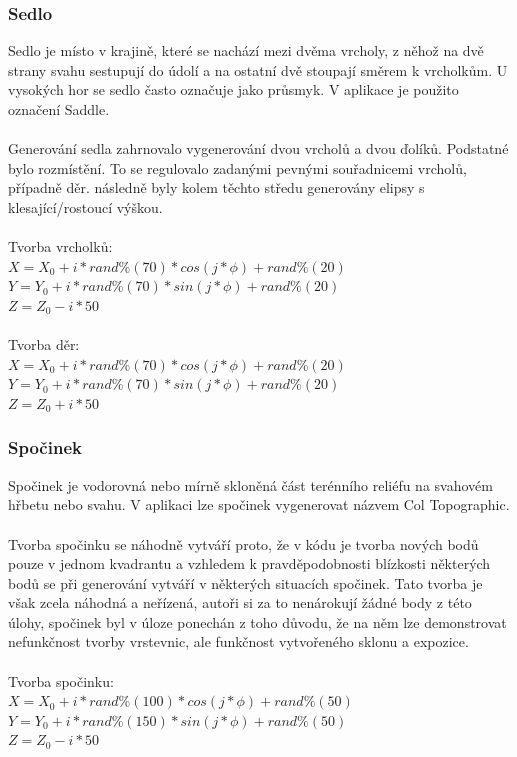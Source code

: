 \documentclass[a4paper, 12pt]{article}
\begin{document}
\subsubsection{Sedlo}
Sedlo je místo v krajině, které se nachází mezi dvěma vrcholy, z něhož na dvě strany svahu sestupují do údolí a na ostatní dvě stoupají směrem k vrcholkům. U vysokých hor se sedlo často označuje jako průsmyk. V aplikace je použito označení Saddle. \\
\\
Generování sedla zahrnovalo vygenerování dvou vrcholů a dvou ďolíků. Podstatné bylo rozmístění. To se regulovalo zadanými pevnými souřadnicemi vrcholů, případně děr. následně byly kolem těchto středu generovány elipsy s klesající/rostoucí výškou. \\
\\
Tvorba vrcholků: \\
$ X = X_0 + i * rand\%(70) * cos(j*\phi) + rand\%(20) $ \\
$ Y =  Y_0 + i * rand\%(70) * sin(j*\phi) + rand\%(20) $ \\
$ Z = Z_0 - i * 50 $ \\
\\
Tvorba děr: \\
$ X = X_0 + i * rand\%(70) * cos(j*\phi) + rand\%(20) $ \\
$ Y =  Y_0 + i * rand\%(70) * sin(j*\phi) + rand\%(20) $ \\
$ Z = Z_0 + i * 50 $ \\

\subsubsection{Spočinek}
Spočinek je vodorovná nebo mírně skloněná část terénního reliéfu na svahovém hřbetu nebo svahu. V aplikaci lze spočinek vygenerovat názvem Col Topographic. \\
\\
Tvorba spočinku se náhodně vytváří proto, že v kódu je tvorba nových bodů pouze v jednom kvadrantu a vzhledem k pravděpodobnosti blízkosti některých bodů se při generování vytváří v některých situacích spočinek. Tato tvorba je však zcela náhodná a neřízená, autoři si za to nenárokují žádné body z této úlohy, spočinek byl v úloze ponechán z toho důvodu, že na něm lze demonstrovat nefunkčnost tvorby vrstevnic, ale funkčnost vytvořeného sklonu a expozice. \\
\\
Tvorba spočinku: \\
$ X = X_0 + i * rand\%(100) * cos(j*\phi) + rand\%(50) $ \\
$ Y =  Y_0 + i * rand\%(150) * sin(j*\phi) + rand\%(50) $ \\
$ Z = Z_0 - i * 50 $ \\
\end{document}
